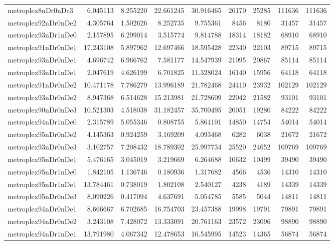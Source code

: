 \begin{longtable}{|l|r|r|r|r|r|r|r|r|}
metroplex8nDr0nDe3 & 6.045113 & 8.255220 & 22.661245 & 30.916465 & 26170 & 25285 & 111636 & 111636 \\
metroplex92nDr0nDe2 & 4.305764 & 1.502626 & 8.252735 & 9.755361 & 8456 & 8180 & 31457 & 31457 \\
metroplex93nDr1nDe0 & 2.157895 & 6.299014 & 3.515774 & 9.814788 & 18314 & 18182 & 68910 & 68910 \\
metroplex91nDr0nDe1 & 17.243108 & 5.897962 & 12.697466 & 18.595428 & 22340 & 22103 & 89715 & 89715 \\
metroplex93nDr0nDe1 & 4.696742 & 6.966762 & 7.581177 & 14.547939 & 21095 & 20867 & 85114 & 85114 \\
metroplex93nDr1nDe1 & 2.047619 & 4.626199 & 6.701825 & 11.328024 & 16140 & 15956 & 64118 & 64118 \\
metroplex91nDr0nDe2 & 10.471178 & 7.786279 & 13.996189 & 21.782468 & 24410 & 23932 & 102129 & 102129 \\
metroplex93nDr0nDe2 & 8.947368 & 6.514628 & 15.213981 & 21.728609 & 22042 & 21582 & 93101 & 93101 \\
metroplex90nDr0nDe3 & 10.521303 & 4.518038 & 31.182457 & 35.700495 & 20051 & 19280 & 84222 & 84222 \\
metroplex94nDr1nDe0 & 2.315789 & 5.055346 & 0.808755 & 5.864101 & 14850 & 14754 & 54014 & 54014 \\
metroplex95nDr0nDe2 & 4.145363 & 0.924259 & 3.169209 & 4.093468 & 6282 & 6038 & 21672 & 21672 \\
metroplex93nDr0nDe3 & 3.102757 & 7.208432 & 18.789302 & 25.997734 & 25520 & 24652 & 109769 & 109769 \\
metroplex95nDr0nDe1 & 5.476165 & 3.045019 & 3.219669 & 6.264688 & 10632 & 10499 & 39490 & 39490 \\
metroplex95nDr1nDe0 & 1.842105 & 1.136746 & 0.180936 & 1.317682 & 4566 & 4536 & 14310 & 14310 \\
metroplex95nDr1nDe1 & 13.784461 & 0.738019 & 1.802108 & 2.540127 & 4238 & 4189 & 14339 & 14339 \\
metroplex95nDr0nDe3 & 8.090226 & 0.417094 & 4.637691 & 5.054785 & 5585 & 5044 & 14811 & 14811 \\
metroplex94nDr0nDe1 & 8.666667 & 6.702685 & 16.754703 & 23.457388 & 19998 & 19791 & 79891 & 79891 \\
metroplex94nDr0nDe2 & 3.243108 & 7.428072 & 13.333091 & 20.761163 & 23572 & 23096 & 98890 & 98890 \\
metroplex94nDr1nDe1 & 13.791980 & 4.067342 & 12.478653 & 16.545995 & 14523 & 14365 & 56874 & 56874 \\

\end{longtable}
